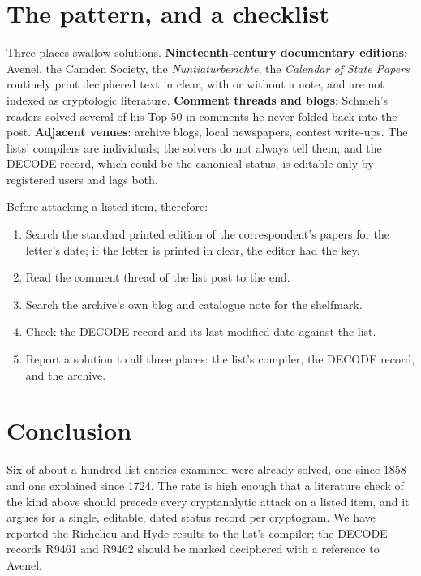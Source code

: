 \documentclass[11pt]{article}
\begin{document}
\section{The pattern, and a checklist}\label{sec:pattern}

Three places swallow solutions. \textbf{Nineteenth-century documentary editions}: Avenel, the Camden Society, the \emph{Nuntiaturberichte}, the \emph{Calendar of State Papers} routinely print deciphered text in clear, with or without a note, and are not indexed as cryptologic literature. \textbf{Comment threads and blogs}: Schmeh's readers solved several of his Top 50 in comments he never folded back into the post. \textbf{Adjacent venues}: archive blogs, local newspapers, contest write-ups. The lists' compilers are individuals; the solvers do not always tell them; and the DECODE record, which could be the canonical status, is editable only by registered users and lags both.

Before attacking a listed item, therefore:
\begin{enumerate}\itemsep0pt
\item Search the standard printed edition of the correspondent's papers for the letter's date; if the letter is printed in clear, the editor had the key.
\item Read the comment thread of the list post to the end.
\item Search the archive's own blog and catalogue note for the shelfmark.
\item Check the DECODE record and its last-modified date against the list.
\item Report a solution to all three places: the list's compiler, the DECODE record, and the archive.
\end{enumerate}

\section{Conclusion}

Six of about a hundred list entries examined were already solved, one since 1858 and one explained since 1724. The rate is high enough that a literature check of the kind above should precede every cryptanalytic attack on a listed item, and it argues for a single, editable, dated status record per cryptogram. We have reported the Richelieu and Hyde results to the list's compiler; the DECODE records R9461 and R9462 should be marked deciphered with a reference to Avenel.



\end{document}

